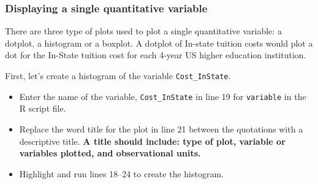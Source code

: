 \documentclass[
]{report}
\newenvironment{Shaded}{\begin{snugshade}}{\end{snugshade}}
\newcommand{\AttributeTok}[1]{\textcolor[rgb]{0.13,0.29,0.53}{#1}}
\newcommand{\CommentTok}[1]{\textcolor[rgb]{0.56,0.35,0.01}{\textit{#1}}}
\newcommand{\DecValTok}[1]{\textcolor[rgb]{0.00,0.00,0.81}{#1}}
\newcommand{\FunctionTok}[1]{\textcolor[rgb]{0.13,0.29,0.53}{\textbf{#1}}}
\newcommand{\NormalTok}[1]{#1}
\newcommand{\SpecialCharTok}[1]{\textcolor[rgb]{0.81,0.36,0.00}{\textbf{#1}}}
\newcommand{\StringTok}[1]{\textcolor[rgb]{0.31,0.60,0.02}{#1}}
\begin{document}
\subsubsection*{Displaying a single quantitative variable}\label{displaying-a-single-quantitative-variable}

There are three type of plots used to plot a single quantitative variable: a dotplot, a histogram or a boxplot. A dotplot of In-state tuition costs would plot a dot for the In-State tuition cost for each 4-year US higher education institution.

First, let's create a histogram of the variable \texttt{Cost\_InState}.

\begin{itemize}
\item
  Enter the name of the variable, \texttt{Cost\_InState} in line 19 for \texttt{variable} in the R script file.
\item
  Replace the word title for the plot in line 21 between the quotations with a descriptive title. \textbf{A title should include: type of plot, variable or variables plotted, and observational units.}
\item
  Highlight and run lines 18--24 to create the histogram.
\end{itemize}

\begin{Shaded}
\end{Shaded}
\end{document}
